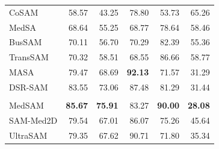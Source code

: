 \documentclass[10pt]{article}
\begin{document}
{\begin{longtable}{lrrrrr}
CoSAM & 58.57 & 43.25 & 78.80 & 53.73 & 65.26 \\
MedSA & 68.64 & 55.25 & 68.77 & 78.64 & 58.46 \\
BusSAM & 70.11 & 56.70 & 70.29 & 82.39 & 55.36 \\
TransSAM & 70.32 & 58.51 & 68.55 & 86.66 & 58.77 \\
MASA & 79.47 & 68.69 & \textbf{92.13} & 71.57 & 31.29 \\
DSR-SAM & 83.55 & 73.06 & 87.48 & 81.29 & 31.44 \\
\addlinespace[2pt]
\multicolumn{6}{l}{\textit{Zero-shot foundation models}} \\
MedSAM & \textbf{85.67} & \textbf{75.91} & 83.27 & \textbf{90.00} & \textbf{28.08} \\
SAM-Med2D & 79.54 & 67.01 & 86.07 & 75.26 & 45.64 \\
UltraSAM & 79.35 & 67.62 & 90.71 & 71.80 & 35.34 \\
\end{longtable}
}
\end{document}
